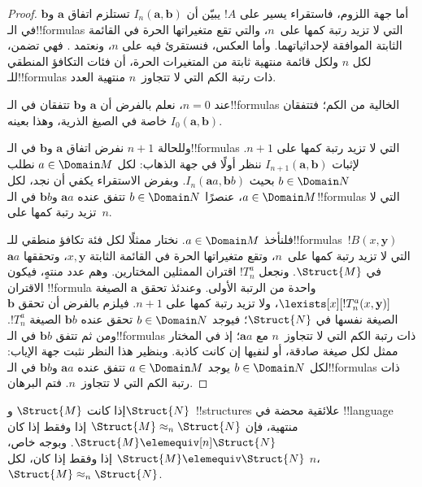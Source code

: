 \documentclass[../../../include/open-logic-section]{subfiles}
\begin{document}
\begin{proof}
  أما جهة اللزوم، فاستقراء يسير على $!A$ يبيّن أن
  $I_n(\mathbf{a},\mathbf{b})$ تستلزم اتفاق $\mathbf{a}$ و$\mathbf{b}$
  في الـ!!{formula}s التي لا تزيد رتبة كمها على~$n$، والتي تقع
  متغيراتها الحرة في القائمة الثابتة الموافقة لإحداثياتهما.
  وأما العكس، فنستقرئ فيه على $n$، ونعتمد
  . فهي تضمن، لكل $n$ ولكل قائمة منتهية
  ثابتة من المتغيرات الحرة، أن فئات التكافؤ المنطقي
  للـ!!{formula}s ذات رتبة الكم التي لا تتجاوز~$n$ منتهية العدد.

  عند $n=0$، نعلم بالفرض أن $\mathbf{a}$ و$\mathbf{b}$ تتفقان
  في الـ!!{formula}s الخالية من الكم؛ فتتفقان خاصة في الصيغ
  الذرية، وهذا بعينه $I_0(\mathbf{a},\mathbf{b})$.

  وللحالة $n+1$ نفرض اتفاق $\mathbf{a}$ و$\mathbf{b}$ في
  الـ!!{formula}s التي لا تزيد رتبة كمها على $n+1$.
  لإثبات $I_{n+1}(\mathbf{a},\mathbf{b})$ ننظر أولًا في جهة
  الذهاب: لكل $a \in \Domain M$ نطلب $b \in \Domain N$ بحيث
  $I_n(\mathbf{a}a,\mathbf{b}b)$. وبفرض الاستقراء يكفي أن
  نجد، لكل $a \in \Domain M$، عنصرًا $b \in \Domain N$
  تتفق عنده $\mathbf{a}a$ و$\mathbf{b}b$ في الـ!!{formula}s
  التي لا تزيد رتبة كمها على~$n$.

  فلنأخذ $a \in \Domain M$. نختار ممثلًا لكل فئة تكافؤ منطقي
  للـ!!{formula}s~$!B(x,\mathbf{y})$ التي لا تزيد رتبة كمها على~$n$،
  وتقع متغيراتها الحرة في القائمة الثابتة $x,\mathbf{y}$،
  وتحققها $\mathbf{a}a$ في $\Struct{M}$. ونجعل $!T^a_n$
  اقتران الممثلين المختارين. وهم عدد منتهٍ، فيكون الاقتران
  !!{formula} واحدة من الرتبة الأولى. وعندئذ تحقق $\mathbf{a}$
  الصيغة $\lexists[x][!T^a_n(x,\mathbf{y})]$، ولا تزيد رتبة
  كمها على $n+1$. فيلزم بالفرض أن تحقق $\mathbf{b}$ الصيغة
  نفسها في $\Struct{N}$؛ فيوجد $b \in \Domain N$ تحقق عنده
  $\mathbf{b}b$ الصيغة $!T^a_n$. ومن ثم تتفق $\mathbf{b}b$
  في الـ!!{formula}s ذات رتبة الكم التي لا تتجاوز~$n$
  مع $\mathbf{a}a$؛ إذ في المختار ممثل لكل صيغة صادقة،
  أو لنفيها إن كانت كاذبة. وبنظير هذا النظر نثبت جهة الإياب:
  لكل $b \in \Domain N$ يوجد $a\in \Domain M$ تتفق عنده
  $\mathbf{a}a$ و$\mathbf{b}b$ في الـ!!{formula}s ذات رتبة
  الكم التي لا تتجاوز~$n$. فتم البرهان.
\end{proof}

\begin{cor}
  إذا كانت $\Struct{M}$ و$\Struct{N}$~!!{structure}s علائقية محضة في
  !!{language} منتهية، فإن $\Struct{M} \approx_n\Struct{N}$ إذا وفقط
  إذا كان $\Struct{M} \elemequiv[n] \Struct{N}$. وبوجه خاص،
  $\Struct{M} \elemequiv \Struct{N}$ إذا وفقط إذا كان، لكل $n$،
  $\Struct{M} \approx_n \Struct{N}$.
\end{cor}
\end{document}
